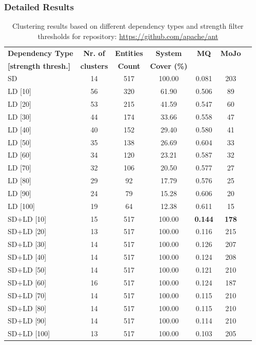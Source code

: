 \documentclass{ieeeaccess}
\begin{document}
\subsubsection{Detailed Results}

\begin{table}
\caption{Clustering results based on different dependency types and strength filter thresholds for repository: \url{https://github.com/apache/ant}}
\label{tab:clustering_results_ant}
\centering
\setlength{\tabcolsep}{3pt}
\begin{tabular}{|l|c|c|c|c|c|c|}
\hline
\textbf{Dependency Type} & \textbf{Nr. of} & \textbf{Entities} & \textbf{System} & \textbf{MQ} & \textbf{MoJo} \\
\textbf{[strength thresh.]} & \textbf{clusters} & \textbf{Count} & \textbf{Cover (\%)} &  &  \\
\hline
SD & 14 & 517 & 100.00 & 0.081 & 203 \\
\hline
LD [10] & 56 & 320 & 61.90 & 0.506 & 89 \\
LD [20] & 53 & 215 & 41.59 & 0.547 & 60 \\
LD [30] & 44 & 174 & 33.66 & 0.558 & 47 \\
LD [40] & 40 & 152 & 29.40 & 0.580 & 41 \\
LD [50] & 35 & 138 & 26.69 & 0.604 & 33 \\
LD [60] & 34 & 120 & 23.21 & 0.587 & 32 \\
LD [70] & 32 & 106 & 20.50 & 0.577 & 27 \\
LD [80] & 29 & 92 & 17.79 & 0.576 & 25 \\
LD [90] & 24 & 79 & 15.28 & 0.606 & 20 \\
LD [100] & 19 & 64 & 12.38 & 0.611 & 15 \\
\hline
SD+LD [10] & 15 & 517 & 100.00 & \cellcolor[HTML]{C0C0C0}\textbf{0.144} & \cellcolor[HTML]{C0C0C0}\textbf{178} \\
SD+LD [20] & 13 & 517 & 100.00 & 0.116 & 215 \\
SD+LD [30] & 14 & 517 & 100.00 & 0.126 & 207 \\
SD+LD [40] & 14 & 517 & 100.00 & 0.124 & 208 \\
SD+LD [50] & 14 & 517 & 100.00 & 0.121 & 210 \\
SD+LD [60] & 16 & 517 & 100.00 & 0.124 & 187 \\
SD+LD [70] & 14 & 517 & 100.00 & 0.115 & 210 \\
SD+LD [80] & 14 & 517 & 100.00 & 0.115 & 210 \\
SD+LD [90] & 14 & 517 & 100.00 & 0.114 & 210 \\
SD+LD [100] & 13 & 517 & 100.00 & 0.103 & 205 \\
\hline
\end{tabular}
\end{table}
\end{document}
